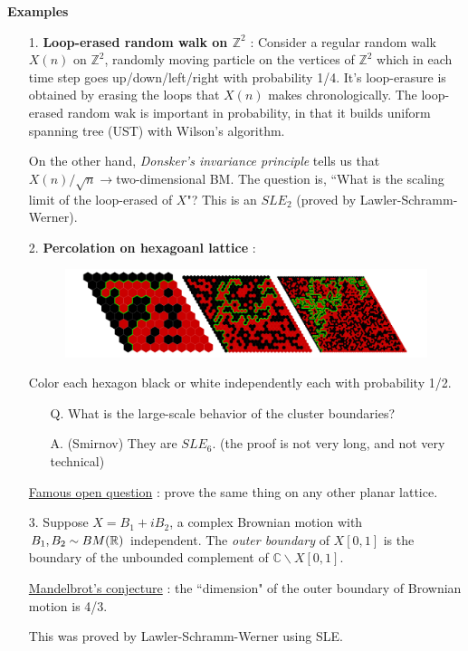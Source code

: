 \documentclass[12pt,a4paper]{article}
\begin{document}
\textbf{Examples}
\begin{itemize}
\item[1.] \textbf{Loop-erased random walk on $\mathbb{Z}^2$} : Consider a regular random walk $X(n)$ on $\mathbb{Z}^2$, randomly moving particle on the vertices of $\mathbb{Z}^2$ which in each time step goes up/down/left/right with probability 1/4. It's loop-erasure is obtained by erasing the loops that $X(n)$ makes chronologically. The loop-erased random wak is important in probability, in that it builds uniform spanning tree (UST) with Wilson's algorithm.

On the other hand, \emph{Donsker's invariance principle} tells us that $X(n)/\sqrt{n} \rightarrow$two-dimensional BM. The question is, ``What is the scaling limit of the loop-erased of $X$"? This is an $SLE_2$ (proved by Lawler-Schramm-Werner).
\item[2.] \textbf{Percolation on hexagoanl lattice} :
\begin{figure}[h]
\begin{center}
    \includegraphics[scale =0.15]{1}
\end{center}
\end{figure}
 Color each hexagon black or white independently each with probability 1/2.
\begin{itemize}
\item[Q.] What is the large-scale behavior of the cluster boundaries?
\item[A.] (Smirnov) They are $SLE_6$. (the proof is not very long, and not very technical)
\end{itemize}
\underline{Famous open question} : prove the same thing on any other planar lattice.
\item[3.] Suppose $X = B_1 + iB_2$, a complex Brownian motion with $B_1, B_2 \sim BM(\mathbb{R})$ independent. The \emph{outer boundary} of $X[0,1]$ is the boundary of the unbounded complement of $\mathbb{C} \backslash X[0,1]$.

\underline{Mandelbrot's conjecture} : the ``dimension" of the outer boundary of Brownian motion is 4/3.

This was proved by Lawler-Schramm-Werner using SLE.
\end{itemize}
\end{document}
